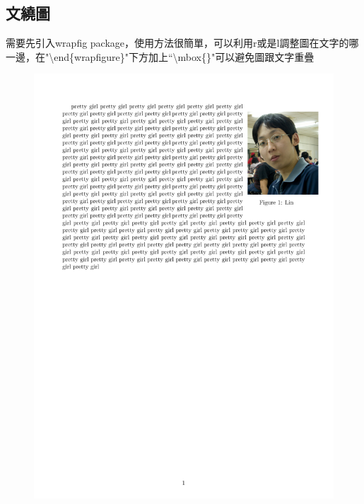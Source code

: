 \documentclass[12pt,a4paper]{report}
\begin{document}
\begin{CJK}{UTF8}{bkai}
\section{文繞圖}
\vspace{-0.5cm}
需要先引入wrapfig package，使用方法很簡單，可以利用r或是l調整圖在文字的哪一邊，在"\textbackslash end\{wrapfigure\}"下方加上``\textbackslash mbox\{\}"可以避免圖跟文字重疊

\begin{figure}[!h] 
\begin{minipage}[b]{0.5\textwidth} 
\centering 
\includegraphics[scale=0.4]{./pics/wrap_figure.pdf} 
\end{minipage}%
\begin{minipage}[b]{0.5\textwidth} 
\begin{footnotesize}
\begin{quote}
\begin{verbatim}

\end{verbatim}
\end{quote}
\end{footnotesize}
\end{minipage}
\end{figure}
\end{CJK}
\end{document}
